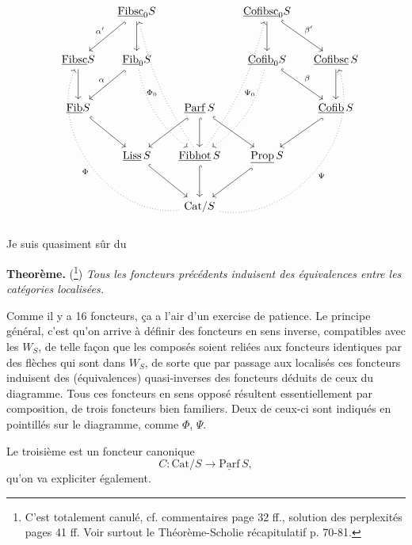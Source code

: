 \documentclass[11pt]{article}
\newcommand{\printedpage}[1]{\marginpar{\footnotesize p.~#1}}
\newcommand{\msp}[1]{\marginpar{\footnotesize [#1]}}
\newcommand{\ul}[1]{\underline{\mathrm{#1}}}
\begin{document}
\printedpage{6}
\msp{page 8}
\[
\begin{tikzcd}[column sep=small, row sep=large]
 & \ul{Fibsc}_0S \arrow[dl, hook, "\alpha'"'] \arrow[d] & & \ul{Cofibsc}_0S \arrow[d] \arrow[dr, hook, "\beta'"] & \\
\ul{Fibsc}S \arrow[d] & \ul{Fib}_0S \arrow[dl, hook, "\alpha"'] \arrow[ddr, dotted, bend right=20] & & \ul{Cofib}_0S \arrow[dr, hook, "\beta"] \arrow[ddl, dotted, bend left=20] & \ul{Cofibsc}\,S \arrow[d] \\
\ul{Fib}S \arrow[dr, hook] & & \ul{Parf}\,S \arrow[dl, hook] \arrow[d, hook] \arrow[dr, hook] & & \ul{Cofib}\,S \arrow[dl, hook] \\
 & \ul{Liss}\,S \arrow[dr, hook] & \ul{Fibhot}\,S \arrow[d, hook] \arrow[uuul, dotted, bend left=10, "\Phi_0"] \arrow[uuur, dotted, bend right=10, "\Psi_0"'] & \ul{Prop}\,S \arrow[dl, hook] & \\
 & & \mathrm{Cat}/S \arrow[uuull, dotted, bend left=60, "\Phi"] \arrow[uuurr, dotted, bend right=60, "\Psi"'] & &
\end{tikzcd}
\]



Je suis quasiment sûr du

\textbf{Theorème.} (\footnote[6]{C'est totalement canulé, cf. commentaires page 32 ff., solution des perplexités pages 41 ff. Voir surtout le Théorème-Scholie récapitulatif p. 70-81.}) \textit{Tous les foncteurs précédents induisent des équivalences entre les catégories localisées.} %

Comme il y a 16 foncteurs, ça a l'air d'un exercise de patience. Le principe général, c'est qu'on arrive à définir des foncteurs en sens inverse, compatibles avec les $W_S$, de telle façon que les composés soient reliées aux foncteurs identiques par des flèches qui sont dans $W_S$, de sorte que par passage aux localisés ces foncteurs induisent des (équivalences) quasi-inverses des foncteurs déduits de ceux du diagramme. Tous ces foncteurs en sens opposé résultent essentiellement par composition, de trois foncteurs bien familiers. Deux de ceux-ci sont indiqués en pointillés sur le diagramme, comme $\Phi$, $\Psi$. %

\msp{page 9}
Le troisième est un foncteur canonique
\[
C : \mathrm{Cat}/S \longrightarrow \ul{Parf}\,S,
\]
qu'on va expliciter également.
\end{document}
